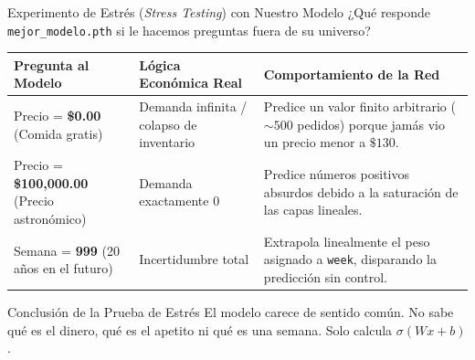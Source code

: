 \documentclass[10pt,aspectratio=169]{beamer}
\begin{document}
\begin{frame}{Experimento de Estrés (\textit{Stress Testing}) con Nuestro Modelo}
  ¿Qué responde \texttt{mejor\_modelo.pth} si le hacemos preguntas fuera de su universo?
  \vspace{0.2cm}

  \begin{center}
    \scriptsize
    \begin{tabular}{p{3.2cm} p{3.2cm} p{5.0cm}}
      \toprule
      \textbf{Pregunta al Modelo} & \textbf{Lógica Económica Real} & \textbf{Comportamiento de la Red} \\
      \midrule
      Precio = \textbf{\$0.00} (Comida gratis) &
      Demanda infinita / colapso de inventario &
      Predice un valor finito arbitrario ($\sim 500$ pedidos) porque jamás vio un precio menor a $\$130$. \\
      \addlinespace
      Precio = \textbf{\$100,000.00} (Precio astronómico) &
      Demanda exactamente $0$ &
      Predice números positivos absurdos debido a la saturación de las capas lineales. \\
      \addlinespace
      Semana = \textbf{999} (20 años en el futuro) &
      Incertidumbre total &
      Extrapola linealmente el peso asignado a \texttt{week}, disparando la predicción sin control. \\
      \bottomrule
    \end{tabular}
  \end{center}

  \vspace{0.2cm}
  \begin{block}{Conclusión de la Prueba de Estrés}
    \scriptsize
    El modelo carece de sentido común. No sabe qué es el dinero, qué es el apetito ni qué es una semana. Solo calcula $\sigma(Wx + b)$.
  \end{block}
\end{frame}
\end{document}

